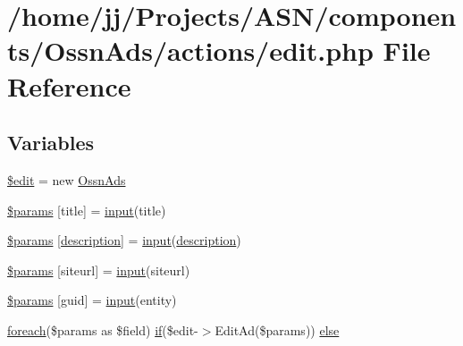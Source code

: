 \hypertarget{components_2_ossn_ads_2actions_2edit_8php}{}\section{/home/jj/\+Projects/\+A\+S\+N/components/\+Ossn\+Ads/actions/edit.php File Reference}
\label{components_2_ossn_ads_2actions_2edit_8php}
\subsection*{Variables}
\begin{DoxyCompactItemize}
\item 
\hyperlink{components_2_ossn_ads_2actions_2edit_8php_a5b4e1531e369399faa047daed66816e7}{\$edit} = new \hyperlink{class_ossn_ads}{Ossn\+Ads}
\item 
\hyperlink{components_2_ossn_ads_2actions_2edit_8php_af32dd378cc53c2808c30eef45b59e35b}{\$params} \mbox{[}\textquotesingle{}title\textquotesingle{}\mbox{]} = \hyperlink{ossn_8lib_8input_8php_a64ebee98b041c4f75f71ed3cd73cc8ed}{input}(\textquotesingle{}title\textquotesingle{})
\item 
\hyperlink{components_2_ossn_ads_2actions_2edit_8php_aafea17cf6bee6d7d0438786e422c0ef3}{\$params} \mbox{[}\textquotesingle{}\hyperlink{components_2_ossn_wall_2actions_2wall_2post_2edit_8php_a7f60fcaa72b0968e6b6bd7d819fa6fd9}{description}\textquotesingle{}\mbox{]} = \hyperlink{ossn_8lib_8input_8php_a64ebee98b041c4f75f71ed3cd73cc8ed}{input}(\textquotesingle{}\hyperlink{components_2_ossn_wall_2actions_2wall_2post_2edit_8php_a7f60fcaa72b0968e6b6bd7d819fa6fd9}{description}\textquotesingle{})
\item 
\hyperlink{components_2_ossn_ads_2actions_2edit_8php_ad013faa5eae30b9aa01b44779a88194b}{\$params} \mbox{[}\textquotesingle{}siteurl\textquotesingle{}\mbox{]} = \hyperlink{ossn_8lib_8input_8php_a64ebee98b041c4f75f71ed3cd73cc8ed}{input}(\textquotesingle{}siteurl\textquotesingle{})
\item 
\hyperlink{components_2_ossn_ads_2actions_2edit_8php_a8d9f6c370a6f2bc546ef545db5edd2d6}{\$params} \mbox{[}\textquotesingle{}guid\textquotesingle{}\mbox{]} = \hyperlink{ossn_8lib_8input_8php_a64ebee98b041c4f75f71ed3cd73cc8ed}{input}(\textquotesingle{}entity\textquotesingle{})
\item 
\hyperlink{user__timeline_8php_a1b18c909b5f0affc85267f294d947c4b}{foreach}(\$params as \$field) \hyperlink{jquery_8tokeninput_8js_ad8dd46a3cbc004569e34401e9e71771a}{if}(\$edit-\/$>$Edit\+Ad(\$params)) \hyperlink{components_2_ossn_ads_2actions_2edit_8php_ae18c4b91036ab84eeb80c21d3f3455f0}{else}
\end{DoxyCompactItemize}


